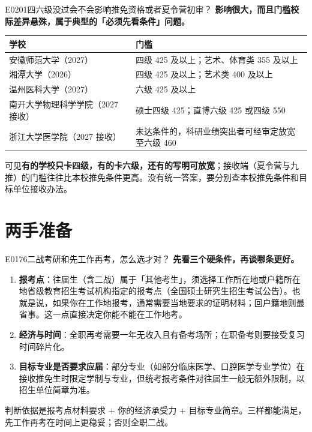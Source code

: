 \begin{qa}{E0201}{四六级没过会不会影响推免资格或者夏令营初审？}
\textbf{影响很大，而且门槛校际差异悬殊，属于典型的「必须先看条件」问题。}
\par\vspace{2pt}\nobreak\begin{center}\footnotesize
\begin{tabularx}{\textwidth}{>{\raggedright\arraybackslash}X>{\raggedright\arraybackslash}X}
\toprule
\textbf{学校} & \textbf{门槛} \\ \midrule
安徽师范大学（2027） & 四级 425 及以上；艺术、体育类 355 及以上 \\
湘潭大学（2026） & 四级 425 及以上；艺术类 400 及以上 \\
温州医科大学（2027） & 六级 425 及以上 \\
南开大学物理科学学院（2027 接收） & 硕士四级 425；直博六级 425 或四级 550 \\
浙江大学医学院（2027 接收） & 未达条件的，科研业绩突出者可经审定放宽至六级 460 \\
\bottomrule
\end{tabularx}
\end{center}\vspace{2pt}\par

可见\textbf{有的学校只卡四级，有的卡六级，还有的写明可放宽}；接收端（夏令营与九推）的门槛往往比本校推免条件更高。没有统一答案，要分别查本校推免条件和目标单位接收办法。
\end{qa}

\section{两手准备}
\begin{qa}{E0176}{二战考研和先工作再考，怎么选才对？}
\textbf{先看三个硬条件，再谈哪条更好。}
\begin{enumerate}
  \item \textbf{报考点}：往届生（含二战）属于「其他考生」，须选择工作所在地或户籍所在地省级教育招生考试机构指定的报考点（全国硕士研究生招生考试公告）。也就是说，如果你在工作地报考，通常需要当地要求的证明材料；回户籍地则最省事。这一点直接决定你能不能在工作地考。
  \item \textbf{经济与时间}：全职再考需要一年无收入且有备考场所；在职备考则要接受复习时间碎片化。
  \item \textbf{目标专业是否要求应届}：部分专业（如部分临床医学、口腔医学专业学位）在接收推免生时限定学制与专业，但统考报考条件对往届生一般无额外限制，以招生单位简章为准。
\end{enumerate}

判断依据是报考点材料要求 + 你的经济承受力 + 目标专业简章。三样都能满足，先工作再考在时间上更稳妥；否则全职二战。
\end{qa}

